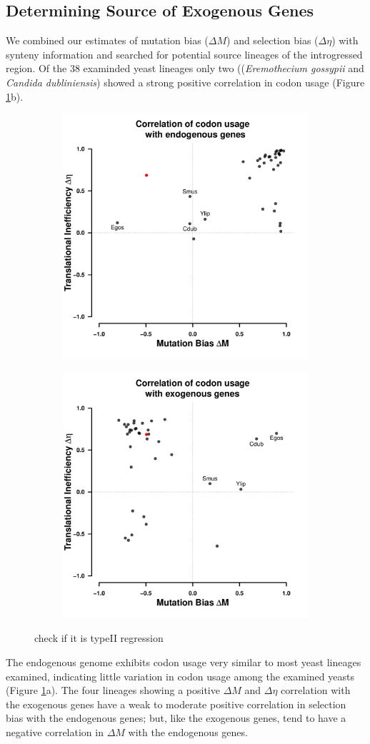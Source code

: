 \documentclass[12pt]{article}
\begin{document}
\subsection*{Determining Source of Exogenous Genes}

We combined our estimates of mutation bias ($\Delta M$) and selection bias ($\Delta \eta$) with synteny information and searched for potential source lineages of the introgressed region.
Of the 38 examinded yeast lineages only two ((\textit{Eremothecium gossypii} and \textit{Candida dubliniensis}) showed a strong positive correlation in codon usage (Figure \ref{fig:csp_endo_exo_comp}b).
\begin{figure}[h]
    \centering
    \begin{subfigure}
        \centering
        \includegraphics[width=.45\textwidth]{img/csp_mean_correlation_endo.pdf}
    \end{subfigure}
    \begin{subfigure}
        \centering
        \includegraphics[width=.45\textwidth]{img/csp_mean_correlation_exo.pdf}
    \end{subfigure}
    \caption{check if it is typeII regression}
    \label{fig:csp_endo_exo_comp}
\end{figure}
The endogenous \kluyveri genome exhibits codon usage very similar to most yeast lineages examined, indicating little variation in codon usage among the examined yeasts (Figure \ref{fig:csp_endo_exo_comp}a).
The four lineages showing a positive $\Delta M$ and $\Delta \eta$ correlation with the exogenous genes have a weak to moderate positive correlation in selection bias with the endogenous genes; but, like the exogenous genes, tend to have a negative correlation in $\Delta M$ with the endogenous genes.
\end{document}
